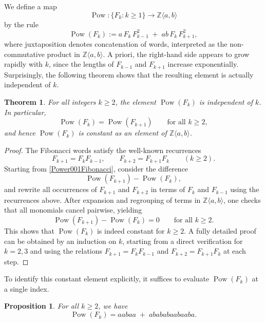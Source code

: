 \documentclass[12pt, a4paper]{article}
\newtheorem{theorem}{Theorem}[section]
\newtheorem{proposition}{Proposition}[section]
\begin{document}
We define a map
\[
\operatorname{Pow} : \{F_k : k \ge 1\} \longrightarrow \mathbb{Z}\langle a,b \rangle
\]
by the rule
\begin{equation}\label{Power001Fibonacci}
\operatorname{Pow}(F_k) := a\, F_k\, F_{k-1}^2 \;+\; ab\, F_k\, F_{k+1}^2,
\end{equation}
where juxtaposition denotes concatenation of words, interpreted as the non-commutative product in $\mathbb{Z}\langle a,b\rangle$. A priori, the right-hand side appears to grow rapidly with $k$, since the lengths of $F_{k-1}$ and $F_{k+1}$ increase exponentially. Surprisingly, the following theorem shows that the resulting element is actually independent of $k$.

\begin{theorem}\label{TheoremPOWERfIB}
For all integers $k \ge 2$, the element $\operatorname{Pow}(F_k)$ is independent of $k$. In particular,
\[
\operatorname{Pow}(F_k) = \operatorname{Pow}(F_{k+1}) \qquad \text{for all } k \ge 2,
\]
and hence $\operatorname{Pow}(F_k)$ is constant as an element of $\mathbb{Z}\langle a,b\rangle$.
\end{theorem}

\begin{proof}[Proof]
The Fibonacci words satisfy the well-known recurrences
\[
F_{k+1} = F_k F_{k-1},
\qquad
F_{k+2} = F_{k+1} F_k
\qquad (k \ge 2).
\]
Starting from \eqref{Power001Fibonacci}, consider the difference
\[
\operatorname{Pow}(F_{k+1}) - \operatorname{Pow}(F_k),
\]
and rewrite all occurrences of $F_{k+1}$ and $F_{k+2}$ in terms of $F_k$ and $F_{k-1}$ using the recurrences above. After expansion and regrouping of terms in $\mathbb{Z}\langle a,b\rangle$, one checks that all monomials cancel pairwise, yielding
\[
\operatorname{Pow}(F_{k+1}) - \operatorname{Pow}(F_k) = 0
\qquad \text{for all } k \ge 2.
\]
This shows that $\operatorname{Pow}(F_k)$ is indeed constant for $k \ge 2$. A fully detailed proof can be obtained by an induction on $k$, starting from a direct verification for $k=2,3$ and using the relations $F_{k+1}=F_kF_{k-1}$ and $F_{k+2}=F_{k+1}F_k$ at each step.
\end{proof}

To identify this constant element explicitly, it suffices to evaluate $\operatorname{Pow}(F_k)$ at a single index.

\begin{proposition}\label{prop:Pow-value}
For all $k \ge 2$, we have
\[
\operatorname{Pow}(F_k) = aabaa \;+\; abababaabaaba.
\]
\end{proposition}
\end{document}

